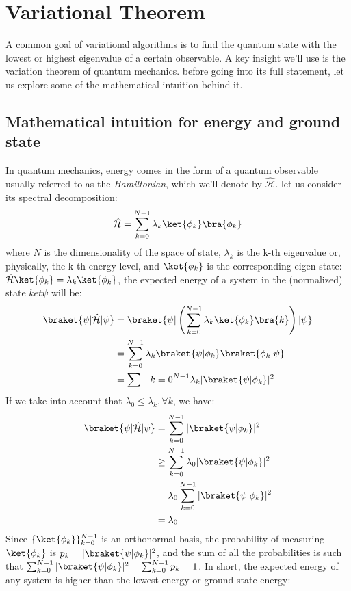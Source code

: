 \documentclass[12pt, oneside]{book}
\theoremstyle{definition}
\theoremstyle{definition}
\theoremstyle{remark}
\begin{document}
\section{Variational Theorem}
A common goal of variational algorithms is to find the quantum state with the lowest or highest eigenvalue of a certain observable. A key insight we'll use is the variation theorem of quantum mechanics. before going into its full statement, let us explore some of the mathematical intuition behind it.

\subsection{Mathematical intuition for energy and ground state}
In quantum mechanics, energy comes in the form of a quantum observable usually referred to as the \textit{Hamiltonian}, which we'll denote by $\hat{\mathcal{H}}$. let us consider its spectral decomposition:
\[
\hat{\mathcal{H}}=\sum_{k=0}^{N-1} \lambda_k\ket{\phi_k}\bra{\phi_k}
\]
where $N$ is the dimensionality of the space of state, $\lambda_k$ is the k-th eigenvalue or, physically, the k-th energy level, and $\ket{\phi_k}$ is the corresponding eigen state: $\hat{\mathcal{H}}\ket{\phi_k}=\lambda_k\ket{\phi_k}$, the expected energy of a system in the (normalized) state $ket{\psi}$ will be:
\begin{align*}
\braket{\psi|\hat{\mathcal{H}}|\psi}&=\braket{\psi|\left(\sum_{k=0}^{N-1}\lambda_k\ket{\phi_k}\bra{k}\right)|\psi}\\
&=\sum_{k=0}^{N-1}\lambda_k\braket{\psi|\phi_k}\braket{\phi_k|\psi}\\
&=\sum-{k=0}^{N-1}\lambda_k|\braket{\psi|\phi_k}|^2
\end{align*}
If we take into account that $\lambda_0\leq\lambda_k, \forall k$, we have:
\begin{align*}
    \braket{\psi|\hat{\mathcal{H}}|\psi}&=\sum_{k=0}^{N-1}|\braket{\psi|\phi_k}|^2\\
    &\geq \sum_{k=0}^{N-1} \lambda_0|\braket{\psi|\phi_k}|^2\\
    &=\lambda_0\sum_{k=0}^{N-1}|\braket{\psi|\phi_k}|^2\\
    &=\lambda_0
\end{align*}
Since $\{\ket{\phi_k}\}_{k=0}^{N-1}$ is an orthonormal basis, the probability of measuring $\ket{\phi_k}$ is $p_k=|\braket{\psi|\phi_k}|^2$, and the sum of all the probabilities is such that $\sum_{k=0}^{N-1}|\braket{\psi|\phi_k}|^2=\sum_{k=0}^{N-1}p_k=1$. In short, the expected energy of any system is higher than the lowest energy or ground state energy:
\end{document}
